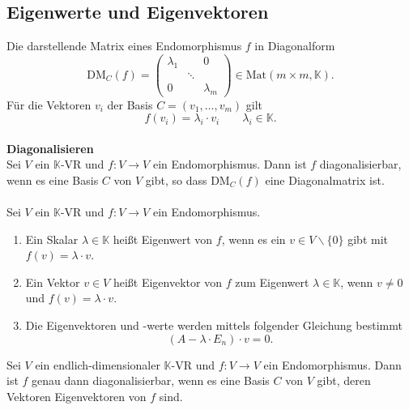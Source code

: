 \documentclass[a4paper,12pt]{article}
\begin{document}
\subsection{Eigenwerte und Eigenvektoren}
Die darstellende Matrix eines Endomorphismus $f$ in Diagonalform
\[ 
        \text{DM}_C\left(f\right)=\left(\begin{matrix}
                        \lambda _1&&0\\
                                  &\ddots &\\
                        0&&\lambda _m
        \end{matrix}\right) \in \text{Mat}\left(m\times m,\mathbb{K}\right)
.\] 
Für die Vektoren $v_i$ der Basis $C=\left(v_1,\hdots ,v_m\right)$ gilt
\[ 
        f\left(v_i\right)=\lambda _i\cdot v_i\qquad \lambda _i \in \mathbb{K}
.\] 
\hfill\\\textbf{Diagonalisieren}\\ 
Sei $V$ ein $\mathbb{K}$-VR und $f:V\rightarrow V$ ein Endomorphismus. Dann ist $f$ diagonalisierbar, wenn es eine Basis $C$ von $V$ gibt, so dass $\text{DM}_C\left(f\right)$ eine Diagonalmatrix ist.\\\\
Sei $V$ ein $\mathbb{K}$-VR und $f:V\rightarrow V$ ein Endomorphismus.
\begin{enumerate}[label=(\alph*)]
        \item Ein Skalar $\lambda  \in \mathbb{K}$ heißt Eigenwert von $f$, wenn es ein $v \in V\backslash\{0\}$ gibt mit $f\left(v\right)=\lambda \cdot v$.
        \item Ein Vektor $v \in V$ heißt Eigenvektor von $f$ zum Eigenwert $\lambda  \in \mathbb{K}$, wenn $v\neq 0$ und $f\left(v\right)=\lambda \cdot v$. 
        \item Die Eigenvektoren und -werte werden mittels folgender Gleichung bestimmt
                \[ 
                        \left(A-\lambda \cdot E_n\right)\cdot v=0
                .\] 
\end{enumerate} 
Sei $V$ ein endlich-dimensionaler $\mathbb{K}$-VR und $f:V\rightarrow V$ ein Endomorphismus. Dann ist $f$ genau dann diagonalisierbar, wenn es eine Basis $C$ von $V$ gibt, deren Vektoren Eigenvektoren von $f$ sind.
\end{document}
